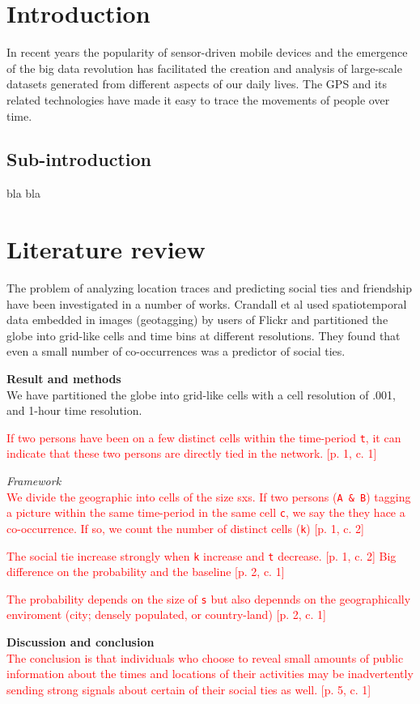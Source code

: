 \section{Introduction}
In recent years the popularity of sensor-driven mobile devices and the emergence of the big data revolution has facilitated the creation and analysis of large-scale datasets generated from different aspects of our daily lives\cite{lazer2009life}. The GPS and its related technologies have made it easy to trace the movements of people over time.

\subsection{Sub-introduction}
bla bla


\section{Literature review}
The problem of analyzing location traces and predicting social ties and friendship have been investigated in a number of works. Crandall et al\cite{ISTfGC} used spatiotemporal data embedded in images (geotagging) by users of Flickr and partitioned the globe into grid-like cells and time bins at different resolutions. They found that even a small number of co-occurrences was a predictor of social ties.



\textbf{Result and methods}\\
We have partitioned the globe into grid-like cells with a cell resolution of .001\degree, and 1-hour time resolution. 

\textcolor{red}{If two persons have been on a few distinct cells within the time-period \texttt{t}, it can indicate that these two persons are directly tied in the network. [p. 1, c. 1]}

\textit{Framework}\\
\textcolor{red}{We divide the geographic into cells of the size sxs. 
If two persons (\texttt{A \& B}) tagging a picture within the same time-period in the same cell \texttt{c}, we say the they hace a co-occurrence. If so, we count the number of distinct cells (\texttt{k}) [p. 1, c. 2]}


\textcolor{red}{The social tie increase strongly when \texttt{k} increase and \texttt{t} decrease. [p. 1, c. 2]
Big difference on the probability and the baseline [p. 2, c. 1]}

\textcolor{red}{The probability depends on the size of \texttt{s} but also depennds on the geographically enviroment (city; densely populated, or country-land) [p. 2, c. 1]}


\textbf{Discussion and conclusion}\\
\textcolor{red}{The conclusion is that individuals who choose to reveal small amounts of public information about the times and locations of their activities may be inadvertently sending strong signals about certain of their social ties as well. [p. 5, c. 1]}